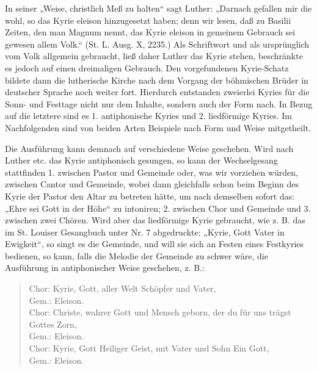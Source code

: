 In seiner „Weise, christlich Meß zu halten“ sagt Luther: „Darnach gefallen mir die wohl, so das Kyrie eleison hinzugesetzt haben; denn wir
lesen, daß zu Basilii Zeiten, den man Magnum nennt, das Kyrie eleison in gemeinem Gebrauch sei gewesen allem Volk.“ (St. L. Ausg. X, 2235.) Als Schriftwort und als ursprünglich vom Volk allgemein gebraucht, ließ daher Luther das Kyrie stehen, beschränkte es jedoch auf einen dreimaligen Gebrauch. Den vorgefundenen Kyrie-Schatz bildete dann die lutherische Kirche nach dem Vorgang der böhmischen Brüder in deutscher Sprache noch weiter fort. Hierdurch entstanden zweierlei Kyries für die Sonn- und Festtage nicht nur dem Inhalte, sondern auch der Form nach. In Bezug auf die letztere sind es 1. antiphonische Kyries und 2. liedförmige Kyries. Im Nachfolgenden sind von beiden Arten Beispiele nach Form und Weise mitgetheilt.

Die Ausführung kann demnach auf verschiedene Weise geschehen. Wird nach Luther etc. das Kyrie antiphonisch gesungen, so kann der Wechselgesang stattfinden 1. zwischen Pastor und Gemeinde oder, was wir vorziehen würden, zwischen Cantor und Gemeinde, wobei dann gleichfalls schon beim Beginn des Kyrie der Pastor den Altar zu betreten hätte, um nach demselben sofort das: „Ehre sei Gott in der Höhe“ zu intoniren; 2. zwischen Chor und Gemeinde und 3. zwischen zwei Chören. Wird aber das liedförmige Kyrie gebraucht, wie z. B. das im St. Louiser Gesangbuch unter Nr. 7 abgedruckte: „Kyrie, Gott Vater in Ewigkeit“, so singt es die Gemeinde, und will sie sich an Festen eines Festkyries bedienen, so kann, falls die Melodie der Gemeinde zu schwer wäre, die Ausführung in antiphonischer Weise geschehen, z. B.:

\begin{verse}
Chor: Kyrie, Gott, aller Welt Schöpfer und Vater,\\
Gem.: Eleison.\\
Chor: Christe, wahrer Gott und Mensch geborn, der du für uns trägst\\
Gottes Zorn,\\
Gem.: Eleison.\\
Chor: Kyrie, Gott Heiliger Geist, mit Vater und Sohn Ein Gott,\\
Gem.: Eleison.
\end{verse}


